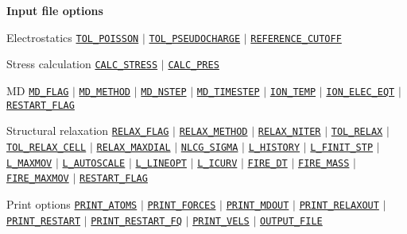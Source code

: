 \documentclass[xcolor=dvipsnames,t]{beamer}
\begin{document}
\begin{frame}[allowframebreaks]{\textbf{Input file options}}
\vspace{-2mm}
\begin{block}{Electrostatics}
\hyperlink{TOL_POISSON}{\texttt{TOL\_POISSON}} $\vert$ \hyperlink{TOL_PSEUDOCHARGE}{\texttt{TOL\_PSEUDOCHARGE}} $\vert$ \hyperlink{REFERENCE_CUTOFF}{\texttt{REFERENCE\_CUTOFF}} 
\end{block}

\vspace{-2mm}
\begin{block}{Stress calculation}
\hyperlink{CALC_STRESS}{\texttt{CALC\_STRESS}} $\vert$ \hyperlink{CALC_PRES}{\texttt{CALC\_PRES}}
\end{block}
\vspace{-2mm}

\begin{block}{MD}
\hyperlink{MD_FLAG}{\texttt{MD\_FLAG}} $\vert$ \hyperlink{MD_METHOD}{\texttt{MD\_METHOD}} $\vert$ \hyperlink{MD_NSTEP}{\texttt{MD\_NSTEP}} $\vert$ \hyperlink{MD_TIMESTEP}{\texttt{MD\_TIMESTEP}} $\vert$ \hyperlink{ION_TEMP}{\texttt{ION\_TEMP}} $\vert$ \hyperlink{ION_ELEC_EQT}{\texttt{ION\_ELEC\_EQT}} $\vert$ \hyperlink{RESTART_FLAG}{\texttt{RESTART\_FLAG}}
\end{block}
\vspace{-2mm}
\begin{block}{Structural relaxation}
\hyperlink{RELAX_FLAG}{\texttt{RELAX\_FLAG}} $\vert$ \hyperlink{RELAX_METHOD}{\texttt{RELAX\_METHOD}} $\vert$ \hyperlink{RELAX_NITER}{\texttt{RELAX\_NITER}} $\vert$ \hyperlink{TOL_RELAX}{\texttt{TOL\_RELAX}} $\vert$ \hyperlink{TOL_RELAX_CELL}{\texttt{TOL\_RELAX\_CELL}} $\vert$ \hyperlink{RELAX_MAXDIAL}{\texttt{RELAX\_MAXDIAL}} $\vert$ \hyperlink{NLCG_SIGMA}{\texttt{NLCG\_SIGMA}} $\vert$ \hyperlink{L_HISTORY}{\texttt{L\_HISTORY}} $\vert$ \hyperlink{L_FINIT_STP}{\texttt{L\_FINIT\_STP}} $\vert$ \hyperlink{L_MAXMOV}{\texttt{L\_MAXMOV}} $\vert$ \hyperlink{L_AUTOSCALE}{\texttt{L\_AUTOSCALE}} $\vert$ \hyperlink{L_LINEOPT}{\texttt{L\_LINEOPT}} $\vert$ \hyperlink{L_ICURV}{\texttt{L\_ICURV}} $\vert$ \hyperlink{FIRE_DT}{\texttt{FIRE\_DT}} $\vert$ \hyperlink{FIRE_MASS}{\texttt{FIRE\_MASS}} $\vert$ \hyperlink{FIRE_MAXMOV}{\texttt{FIRE\_MAXMOV}} $\vert$ \hyperlink{RESTART_FLAG}{\texttt{RESTART\_FLAG}}
\end{block}

\begin{block}{Print options}
\hyperlink{PRINT_ATOMS}{\texttt{PRINT\_ATOMS}} $\vert$ \hyperlink{PRINT_FORCES}{\texttt{PRINT\_FORCES}} $\vert$ \hyperlink{PRINT_MDOUT}{\texttt{PRINT\_MDOUT}} $\vert$ \hyperlink{PRINT_RELAXOUT}{\texttt{PRINT\_RELAXOUT}} $\vert$ \hyperlink{PRINT_RESTART}{\texttt{PRINT\_RESTART}} $\vert$ \hyperlink{PRINT_RESTART_FQ}{\texttt{PRINT\_RESTART\_FQ}} $\vert$ \hyperlink{PRINT_VELS}{\texttt{PRINT\_VELS}} $\vert$ \hyperlink{OUTPUT_FILE}{\texttt{OUTPUT\_FILE}}
\end{block}


\end{frame}
\end{document}
